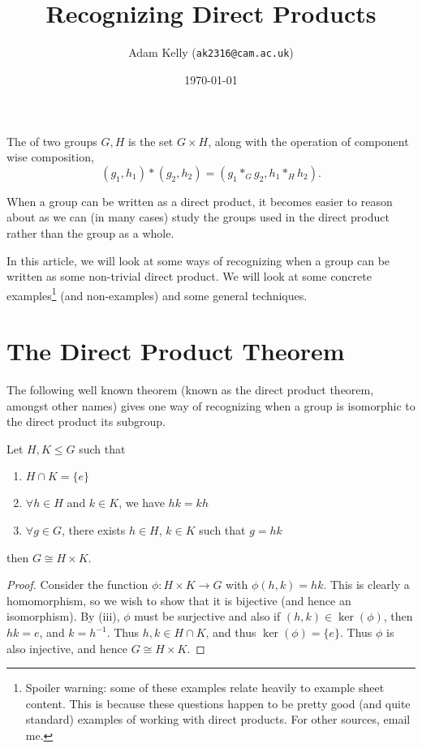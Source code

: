 \documentclass[11pt]{article}
\title{\vspace{-3\baselineskip}\ \\Recognizing Direct Products}
\author{Adam Kelly (\texttt{ak2316@cam.ac.uk})}
\date{\today}
\begin{document}
\maketitle


The  of two groups $G, H$ is the set $G \times H$, along with the operation of component wise composition,
$$
(g_1, h_1) * (g_2, h_2) = (g_1 *_G g_2, h_1 *_H h_2).
$$

When a group can be written as a direct product, it becomes easier to reason about as we can (in many cases) study the groups used in the direct product rather than the group as a whole.

In this article, we will look at some ways of recognizing when a group can be written as some non-trivial direct product. We will look at some concrete examples\footnote{Spoiler warning: some of these examples relate heavily to example sheet content. This is because these questions happen to be pretty good (and quite standard) examples of working with direct products. For other sources, email me.} (and non-examples) and some general techniques.

\section{The Direct Product Theorem}

The following well known theorem (known as the direct product theorem, amongst other names) gives one way of recognizing when a group is isomorphic to the direct product its subgroup.

\begin{theorem}
	Let $H, K \leq G$ such that
	\begin{enumerate}[label=(\roman*)]
		\item $H \cap K = \{e\}$
		\item $\forall h \in H$ and $k \in K$, we have $hk = kh$
		\item $\forall g \in G$, there exists $h \in H$, $k \in K$ such that $g = hk$
	\end{enumerate}
	then $G \cong H \times K$.
\end{theorem}
\begin{proof}
	Consider the function $\phi: H \times K \rightarrow G$ with $\phi(h, k) = hk$. This is clearly a homomorphism, so we wish to show that it is bijective (and hence an isomorphism). By (iii), $\phi$ must be surjective and also if $(h, k) \in \operatorname{ker}(\phi)$, then $hk = e$, and $k = h^{-1}$. Thus $h, k \in H \cap K$, and thus $\ker(\phi) = \{e\}$. Thus $\phi$ is also injective, and hence $G \cong H \times K$.
\end{proof}
\end{document}

